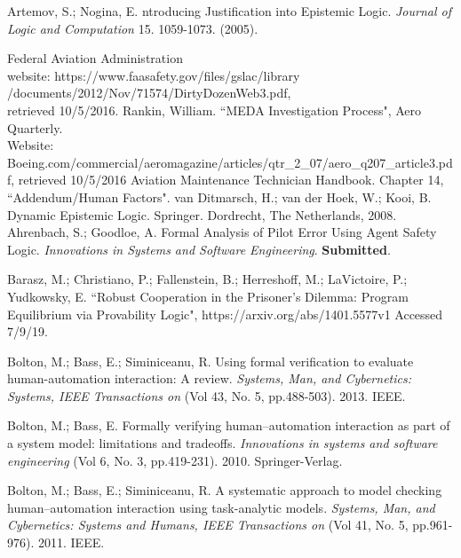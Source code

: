 \newpage
{}


%
\begin{thebibliography}{9}
		Artemov, S.; Nogina, E. ntroducing Justification into Epistemic Logic. {\em Journal of Logic and Computation } 15. 1059-1073. (2005). 
	
	 	 Federal Aviation Administration \\ website: https://www.faasafety.gov/files/gslac/library\\/documents/2012/Nov/71574/DirtyDozenWeb3.pdf,\\
	 	retrieved 10/5/2016.
	 	 Rankin, William. ``MEDA Investigation Process", Aero Quarterly.\\ Website: Boeing.com/commercial/aeromagazine/articles/qtr\_2\_07/aero\_q207\_article3.pdf,
	 	retrieved 10/5/2016
	 	 Aviation Maintenance Technician Handbook. Chapter 14, ``Addendum/Human Factors". 
	 	 van Ditmarsch, H.; van der Hoek, W.; Kooi, B. Dynamic Epistemic Logic. Springer. Dordrecht, The Netherlands, 2008. 
	 	Ahrenbach, S.; Goodloe, A. Formal Analysis of Pilot Error Using Agent Safety Logic. {\em Innovations in Systems and Software Engineering}. {\bf Submitted}.
	 	
	 	Barasz, M.; Christiano, P.; Fallenstein, B.; Herreshoff, M.; LaVictoire, P.; Yudkowsky, E. ``Robust Cooperation in the Prisoner's Dilemma: Program Equilibrium via Provability Logic", https://arxiv.org/abs/1401.5577v1 Accessed 7/9/19.
	 	
	 	Bolton, M.; Bass, E.; Siminiceanu, R. Using formal verification to evaluate human-automation interaction: A review. \emph{Systems, Man, and Cybernetics: Systems, IEEE Transactions on} (Vol 43, No. 5, pp.488-503). 2013. IEEE.
	 	
	 	Bolton, M.; Bass, E. Formally verifying human--automation interaction as part of a system model: limitations and tradeoffs. \emph{Innovations in systems and software engineering} (Vol 6, No. 3, pp.419-231). 2010. Springer-Verlag.
	 	
	 	Bolton, M.; Bass, E.; Siminiceanu, R. A systematic approach to model checking human--automation interaction using task-analytic models. \emph{Systems, Man, and Cybernetics: Systems and Humans, IEEE Transactions on} (Vol 41, No. 5, pp.961-976). 2011. IEEE.
	 	

\end{thebibliography}
